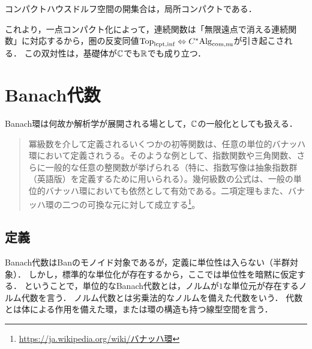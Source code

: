 \documentclass[uplatex,dvipdfmx]{jsreport}
\begin{document}
\begin{lemma}
    コンパクトハウスドルフ空間の開集合は，局所コンパクトである．
\end{lemma}
\begin{remarks}
    これより，一点コンパクト化によって，連続関数は「無限遠点で消える連続関数」に対応するから，圏の反変同値$\mathrm{Top}_{\mathrm{lcpt},\mathrm{inf}}\Leftrightarrow C^*\mathrm{Alg}_{\mathrm{com},\mathrm{nu}}$が引き起こされる．
    この双対性は，基礎体が$\mathbb{C}$でも$\mathbb{R}$でも成り立つ．
\end{remarks}

\section{Banach代数}

\begin{tcolorbox}[colframe=ForestGreen, colback=ForestGreen!10!white,breakable,colbacktitle=ForestGreen!40!white,coltitle=black,fonttitle=\bfseries\sffamily,
    title=]
    Banach環は何故か解析学が展開される場として，$\mathbb{C}$の一般化としても扱える．
    \begin{quote}
        冪級数を介して定義されるいくつかの初等関数は、任意の単位的バナッハ環において定義されうる。そのような例として、指数関数や三角関数、さらに一般的な任意の整関数が挙げられる（特に、指数写像は抽象指数群（英語版）を定義するために用いられる）。幾何級数の公式は、一般の単位的バナッハ環においても依然として有効である。二項定理もまた、バナッハ環の二つの可換な元に対して成立する\footnote{\url{https://ja.wikipedia.org/wiki/バナッハ環}}。
    \end{quote}
\end{tcolorbox}

\subsection{定義}

\begin{tcolorbox}[colframe=ForestGreen, colback=ForestGreen!10!white,breakable,colbacktitle=ForestGreen!40!white,coltitle=black,fonttitle=\bfseries\sffamily,
title=]
    Banach代数はBanのモノイド対象であるが，定義に単位性は入らない（半群対象）．
    しかし，標準的な単位化が存在するから，ここでは単位性を暗黙に仮定する．
    ということで，単位的なBanach代数とは，ノルムが$1$な単位元が存在するノルム代数を言う．
    ノルム代数とは劣乗法的なノルムを備えた代数をいう．
    代数とは体による作用を備えた環，または環の構造も持つ線型空間を言う．
\end{tcolorbox}
\end{document}
